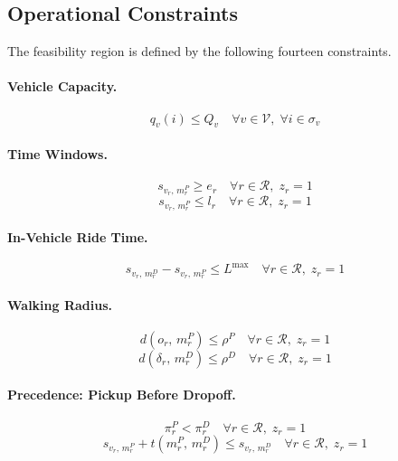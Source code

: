 \subsection{Operational Constraints}

The feasibility region is defined by the following fourteen constraints.

\paragraph{Vehicle Capacity.}
\begin{equation}\label{con:capacity}
  q_v(i) \leq Q_v \quad \forall v \in \mathcal{V},\; \forall i \in \sigma_v
\end{equation}

\paragraph{Time Windows.}
\begin{equation}\label{con:tw-early}
  s_{v_r,\, m_r^P} \geq e_r \quad \forall r \in \mathcal{R},\; z_r = 1
\end{equation}
\begin{equation}\label{con:tw-late}
  s_{v_r,\, m_r^P} \leq l_r \quad \forall r \in \mathcal{R},\; z_r = 1
\end{equation}

\paragraph{In-Vehicle Ride Time.}
\begin{equation}\label{con:ridetime}
  s_{v_r,\, m_r^D} - s_{v_r,\, m_r^P} \leq L^{\max} \quad \forall r \in \mathcal{R},\; z_r = 1
\end{equation}

\paragraph{Walking Radius.}
\begin{equation}\label{con:walk-pickup}
  d(o_r,\, m_r^P) \leq \rho^P \quad \forall r \in \mathcal{R},\; z_r = 1
\end{equation}
\begin{equation}\label{con:walk-dropoff}
  d(\delta_r,\, m_r^D) \leq \rho^D \quad \forall r \in \mathcal{R},\; z_r = 1
\end{equation}

\paragraph{Precedence: Pickup Before Dropoff.}
\begin{equation}\label{con:precedence-pos}
  \pi_r^P < \pi_r^D \quad \forall r \in \mathcal{R},\; z_r = 1
\end{equation}
\begin{equation}\label{con:precedence-time}
  s_{v_r,\, m_r^P} + t(m_r^P,\, m_r^D) \leq s_{v_r,\, m_r^D} \quad \forall r \in \mathcal{R},\; z_r = 1
\end{equation}

